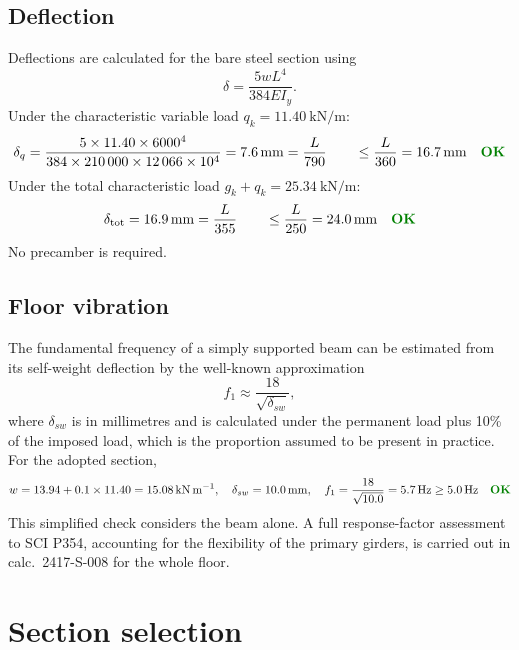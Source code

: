 \documentclass[11pt,a4paper]{article}
\newcommand{\pass}{\textcolor{green!50!black}{\textbf{OK}}}
\begin{document}
\subsection{Deflection}

Deflections are calculated for the bare steel section using
\begin{equation}
  \delta = \frac{5 w L^4}{384 E I_y}.
\end{equation}
Under the characteristic variable load $q_k = \qty{11.40}{\kN\per\metre}$:
\begin{equation}
  \delta_q = \frac{5 \times 11.40 \times 6000^4}{384 \times 210\,000 \times 12\,066 \times 10^4} = \qty{7.6}{\milli\metre} = \frac{L}{790}
  \qquad \le \frac{L}{360} = \qty{16.7}{\milli\metre} \quad \pass
\end{equation}
Under the total characteristic load $g_k + q_k = \qty{25.34}{\kN\per\metre}$:
\begin{equation}
  \delta_{\text{tot}} = \qty{16.9}{\milli\metre} = \frac{L}{355}
  \qquad \le \frac{L}{250} = \qty{24.0}{\milli\metre} \quad \pass
\end{equation}
No precamber is required.

\subsection{Floor vibration}

The fundamental frequency of a simply supported beam can be estimated from its self-weight deflection by the well-known approximation
\begin{equation}
  f_1 \approx \frac{18}{\sqrt{\delta_{sw}}},
\end{equation}
where $\delta_{sw}$ is in millimetres and is calculated under the permanent load plus 10\% of the imposed load, which is the proportion assumed to be present in practice. For the adopted section,
\[
  w = 13.94 + 0.1 \times 11.40 = \qty{15.08}{\kN\per\metre}, \quad
  \delta_{sw} = \qty{10.0}{\milli\metre}, \quad
  f_1 = \frac{18}{\sqrt{10.0}} = \qty{5.7}{\hertz} \ge \qty{5.0}{\hertz} \quad \pass
\]
This simplified check considers the beam alone. A full response-factor assessment to SCI P354, accounting for the flexibility of the primary girders, is carried out in calc.\ 2417-S-008 for the whole floor.

\section{Section selection}
\label{sec:selection}
\end{document}
